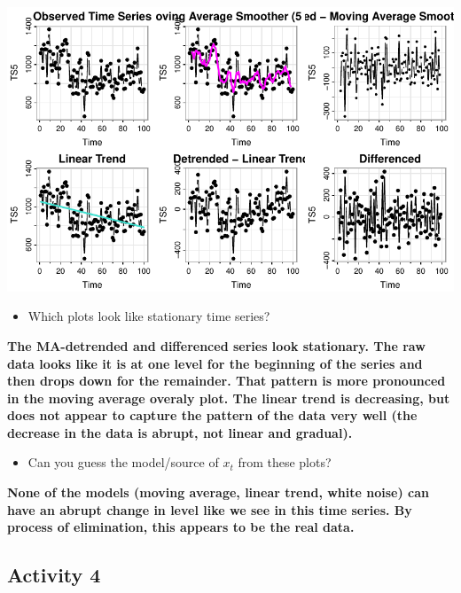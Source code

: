 \documentclass[
  letterpaper,
  DIV=11,
  numbers=noendperiod]{scrartcl}
\providecommand{\tightlist}{%
  \setlength{\itemsep}{0pt}\setlength{\parskip}{0pt}}\usepackage{longtable,booktabs,array}
\begin{document}
\includegraphics{Lecture7_files/figure-pdf/unnamed-chunk-20-1.pdf}

\begin{itemize}
\tightlist
\item
  Which plots look like stationary time series?
\end{itemize}

\textbf{The MA-detrended and differenced series look stationary. The raw
data looks like it is at one level for the beginning of the series and
then drops down for the remainder. That pattern is more pronounced in
the moving average overaly plot. The linear trend is decreasing, but
does not appear to capture the pattern of the data very well (the
decrease in the data is abrupt, not linear and gradual).}

\begin{itemize}
\tightlist
\item
  Can you guess the model/source of \(x_t\) from these plots?
\end{itemize}

\textbf{None of the models (moving average, linear trend, white noise)
can have an abrupt change in level like we see in this time series. By
process of elimination, this appears to be the real data.}

\subsection{Activity 4}\label{activity-4}
\end{document}
